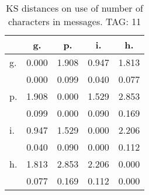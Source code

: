 \begin{table}[h!]
\begin{center}
\begin{tabular}{| l | c | c | c | c |}\hline
 & g. & p. & i. & h. \\\hline
g. & 0.000  & 1.908  & 0.947  & 1.813 \\\hline
 & 0.000  & 0.099  & 0.040  & 0.077 \\\hline
p. & 1.908  & 0.000  & 1.529  & 2.853 \\\hline
 & 0.099  & 0.000  & 0.090  & 0.169 \\\hline
i. & 0.947  & 1.529  & 0.000  & 2.206 \\\hline
 & 0.040  & 0.090  & 0.000  & 0.112 \\\hline
h. & 1.813  & 2.853  & 2.206  & 0.000 \\\hline
 & 0.077  & 0.169  & 0.112  & 0.000 \\\hline
\end{tabular}
\caption{KS distances on use of number of characters in messages. TAG: 11}
\end{center}
\end{table}